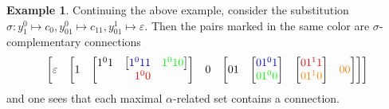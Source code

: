 \documentclass[11pt]{article}
\theoremstyle{definition}
\theoremstyle{definition}
\theoremstyle{definition}
\theoremstyle{definition}
\theoremstyle{definition}
\theoremstyle{definition}
\newtheorem{example}[theorem]{Example}
\theoremstyle{definition}
\begin{document}
	\begin{example}
		Continuing the above example, consider the substitution $\sigma: y_1^0\mapsto c_0, y_{01}^0\mapsto c_{11}, y_{01}^1\mapsto \varepsilon$. Then the pairs marked in the same color are $\sigma$-complementary connections
		\[
		\begin{bmatrix}
			\varepsilon &
			\begin{bmatrix}
				1 &
				\begin{bmatrix}
					\begin{matrix}
						1^01 & \begin{bmatrix}
							{\color{blue}1^011} & {\color{green}1^010}
						\end{bmatrix}
					\end{matrix} \\ {\color{red}1^00}
				\end{bmatrix} &
				0 &
				\begin{bmatrix}
					01 &
					\begin{bmatrix}
						{\color{blue}01^01} \\ {\color{green}01^00}
					\end{bmatrix} &
					\begin{bmatrix}
						{\color{red}01^11} \\ {\color{orange}01^10}
					\end{bmatrix} &
					{\color{orange}00}
				\end{bmatrix}
			\end{bmatrix}
		\end{bmatrix}
		\]
		and one sees that each maximal $\alpha$-related set contains a connection.
	\end{example}
\end{document}
